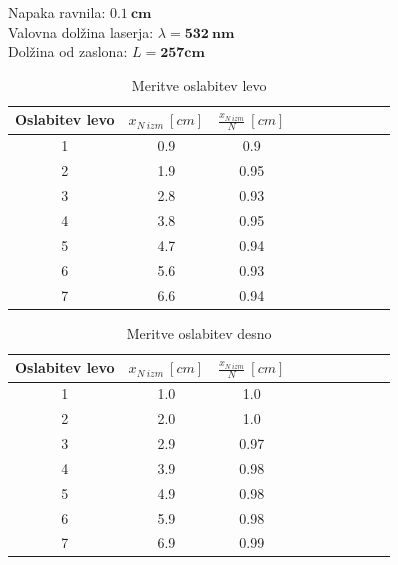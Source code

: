 \documentclass{report}
\begin{document}
\noindent Napaka ravnila: $\bm{0.1 \ cm}$\\
Valovna dolžina laserja: $\lambda = \bm{532 \ nm}$\\
Dolžina od zaslona: $L = \bm{257 cm}$

\begin{table}[H]
  \centering
  \caption{Meritve oslabitev levo}
  \begin{tabular}{cccccccccc}
  \toprule
  Oslabitev levo & $x_{N \ izm} \ [cm]$ & $\frac{x_{N \ izm}}{N} \ [cm]$\\
  \midrule
  1 & 0.9 & 0.9\\
  2 & 1.9 & 0.95\\
  3 & 2.8 & 0.93\\
  4 & 3.8 & 0.95\\
  5 & 4.7 & 0.94\\
  6 & 5.6 & 0.93\\
  7 & 6.6 & 0.94\\
  \bottomrule
  \end{tabular}
\end{table}

\begin{table}[H]
  \centering
  \caption{Meritve oslabitev desno}
  \begin{tabular}{cccccccccc}
  \toprule
  Oslabitev levo & $x_{N \ izm} \ [cm]$ & $\frac{x_{N \ izm}}{N} \ [cm]$\\
  \midrule

  1 & 1.0 & 1.0\\
  2 & 2.0 & 1.0\\
  3 & 2.9 & 0.97\\
  4 & 3.9 & 0.98\\
  5 & 4.9 & 0.98\\
  6 & 5.9 & 0.98\\
  7 & 6.9 & 0.99\\
  \bottomrule
  \end{tabular}
\end{table}
\end{document}
